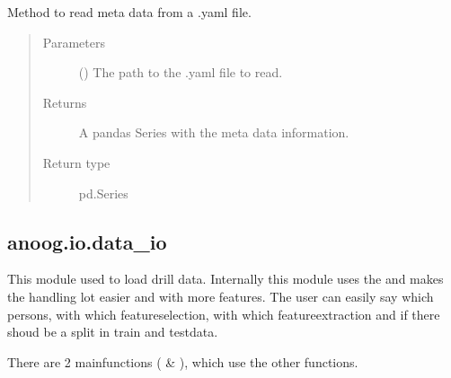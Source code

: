 \documentclass[letterpaper,10pt,english]{sphinxmanual}
\begin{document}

\begin{fulllineitems}
\label{\detokenize{anoog.io:anoog.io.csv_io.read_metadata}}
\sphinxAtStartPar
Method to read meta data from a .yaml file.
\begin{quote}\begin{description}
\item[{Parameters}] \leavevmode
\sphinxAtStartPar
{} () \textendash{} The path to the .yaml file to read.

\item[{Returns}] \leavevmode
\sphinxAtStartPar
A pandas Series with the meta data information.

\item[{Return type}] \leavevmode
\sphinxAtStartPar
pd.Series

\end{description}\end{quote}

\end{fulllineitems}



\subsection{anoog.io.data\_io}
\label{\detokenize{anoog.io:module-anoog.io.data_io}}\label{\detokenize{anoog.io:anoog-io-data-io}}
\sphinxAtStartPar
This module used to load drill data.
Internally this module uses the {\hyperref[\detokenize{anoog.io:module-anoog.io.csv_io}]{}} and makes the handling lot easier and with more features.
The user can easily say which persons, with which feature\sphinxhyphen{}selection, with which feature\sphinxhyphen{}extraction and if there shoud be a split in train and test\sphinxhyphen{}data.

\sphinxAtStartPar
There are 2 main\sphinxhyphen{}functions ({\hyperref[\detokenize{anoog.io:anoog.io.data_io.load_data}]{}} \& ), which use the other functions.
\end{document}
